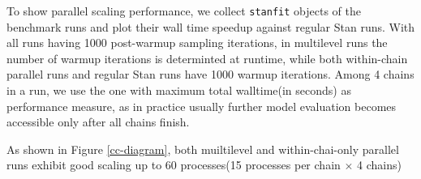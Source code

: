 \documentclass[landscape,a0paper,fontscale=0.5]{baposter} %
\begin{document}
\begin{poster}
{\begin{multicols}{2}
To show parallel scaling performance, we collect \texttt{\texttt{stanfit}} objects of the benchmark runs
and plot their wall time speedup against regular Stan runs. With all
runs having 1000 post-warmup sampling iterations, in
multilevel runs the number of warmup iterations is determinted at
runtime, while both within-chain parallel runs and regular Stan runs
have 1000 warmup iterations. Among 4 chains in a run, we use the
one with maximum total walltime(in seconds) as performance measure, as
in practice usually further model evaluation becomes accessible only
after all chains finish.

As shown in Figure \ref{cc-diagram}, both muiltilevel and
within-chai-only parallel runs exhibit good scaling up to 60
processes(15 processes per chain \(\times\) 4 chains)

\vspace{1em}
\end{multicols}

}




\end{poster}
\end{document}
